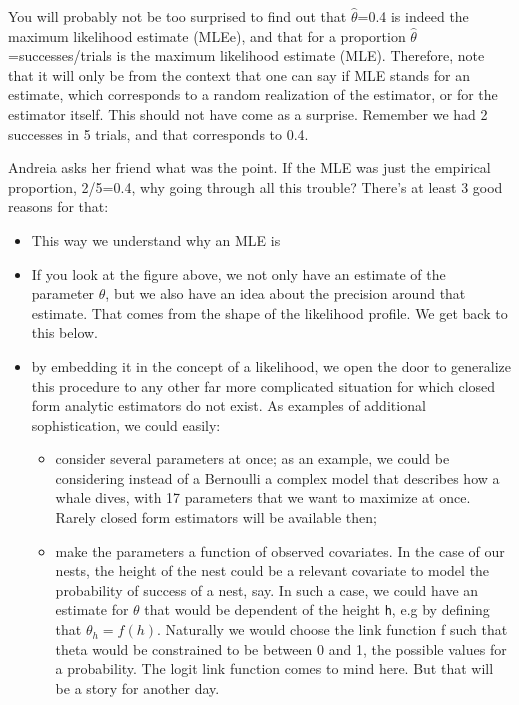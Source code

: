\documentclass[
]{book}
\providecommand{\tightlist}{%
  \setlength{\itemsep}{0pt}\setlength{\parskip}{0pt}}
\begin{document}
You will probably not be too surprised to find out that \(\hat \theta\)=0.4 is indeed the maximum likelihood estimate (MLEe), and that for a proportion \(\hat \theta\)=successes/trials is the maximum likelihood estimate (MLE). Therefore, note that it will only be from the context that one can say if MLE stands for an estimate, which corresponds to a random realization of the estimator, or for the estimator itself. This should not have come as a surprise. Remember we had 2 successes in 5 trials, and that corresponds to 0.4.

Andreia asks her friend what was the point. If the MLE was just the empirical proportion, 2/5=0.4, why going through all this trouble? There's at least 3 good reasons for that:

\begin{itemize}
\tightlist
\item
  This way we understand why an MLE is
\item
  If you look at the figure above, we not only have an estimate of the parameter \(\theta\), but we also have an idea about the precision around that estimate. That comes from the shape of the likelihood profile. We get back to this below.
\item
  by embedding it in the concept of a likelihood, we open the door to generalize this procedure to any other far more complicated situation for which closed form analytic estimators do not exist. As examples of additional sophistication, we could easily:

  \begin{itemize}
  \tightlist
  \item
    consider several parameters at once; as an example, we could be considering instead of a Bernoulli a complex model that describes how a whale dives, with 17 parameters that we want to maximize at once. Rarely closed form estimators will be available then;
  \item
    make the parameters a function of observed covariates. In the case of our nests, the height of the nest could be a relevant covariate to model the probability of success of a nest, say. In such a case, we could have an estimate for \(\theta\) that would be dependent of the height \texttt{h}, e.g by defining that \(\theta_h=f(h)\). Naturally we would choose the link function f such that theta would be constrained to be between 0 and 1, the possible values for a probability. The logit link function comes to mind here. But that will be a story for another day.
  \end{itemize}
\end{itemize}
\end{document}
